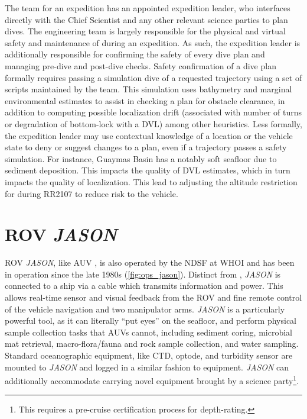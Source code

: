 The \Sentry team for an expedition has an appointed expedition leader, who interfaces directly with the Chief Scientist and any other relevant science parties to plan \Sentry dives. The \Sentry engineering team is largely responsible for the physical and virtual safety and maintenance of \Sentry during an expedition. As such, the expedition leader is additionally responsible for confirming the safety of every dive plan and managing pre-dive and post-dive checks. Safety confirmation of a dive plan formally requires passing a simulation dive of a requested trajectory using a set of scripts maintained by the \Sentry team. This simulation uses bathymetry and marginal environmental estimates to assist in checking a plan for obstacle clearance, in addition to computing possible localization drift (associated with number of turns or degradation of bottom-lock with a DVL) among other heuristics. Less formally, the expedition leader may use contextual knowledge of a location or the vehicle state to deny or suggest changes to a plan, even if a trajectory passes a safety simulation. For instance, Guaymas Basin has a notably soft seafloor due to sediment deposition. This impacts the quality of DVL estimates, which in turn impacts the quality of \Sentry localization. This lead to adjusting the altitude restriction for \Sentry during RR2107 to reduce risk to the vehicle.


\section{ROV \emph{JASON}}
ROV \emph{JASON}, like AUV \Sentry, is also operated by the NDSF at WHOI \autocite{ballard1993medea,yoerger1986jason,petitt2004power} and has been in operation since the late 1980s (\cref{fig:ops_jason}). Distinct from \Sentry, \emph{JASON} is connected to a ship via a cable which transmits information and power. This allows real-time sensor and visual feedback from the ROV and fine remote control of the vehicle navigation and two manipulator arms. \emph{JASON} is a particularly powerful tool, as it can literally ``put eyes'' on the seafloor, and perform physical sample collection tasks that AUVs cannot, including sediment coring, microbial mat retrieval, macro-flora/fauna and rock sample collection, and water sampling. Standard oceanographic equipment, like CTD, optode, and turbidity sensor are mounted to \emph{JASON} and logged in a similar fashion to \Sentry equipment. \emph{JASON} can additionally accommodate carrying novel equipment brought by a science party\footnote{This requires a pre-cruise certification process for depth-rating.}. 

